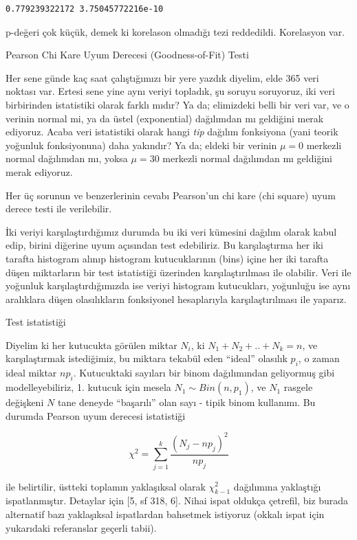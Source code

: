 \documentclass[12pt,fleqn]{article}\usepackage{../../common}
\begin{document}
\begin{verbatim}
0.779239322172 3.75045772216e-10
\end{verbatim}

p-değeri çok küçük, demek ki korelason olmadığı tezi reddedildi. Korelasyon
var.

Pearson Chi Kare Uyum Derecesi (Goodness-of-Fit) Testi

Her sene günde kaç saat çalıştığımızı bir yere yazdık diyelim, elde 365
veri noktası var. Ertesi sene yine aynı veriyi topladık, şu soruyu
soruyoruz, iki veri birbirinden istatistiki olarak farklı mıdır?  Ya da;
elimizdeki belli bir veri var, ve o verinin normal mi, ya da üstel
(exponential) dağılımdan mı geldiğini merak ediyoruz. Acaba veri
istatistiki olarak hangi {\em tip} dağılım fonksiyona (yani teorik yoğunluk
fonksiyonuna) daha yakındır? Ya da; eldeki bir verinin $\mu = 0$ merkezli
normal dağılımdan mı, yoksa $\mu = 30$ merkezli normal dağılımdan mı
geldiğini merak ediyoruz.

Her üç sorunun ve benzerlerinin cevabı Pearson'un chi kare (chi square)
uyum derece testi ile verilebilir. 

İki veriyi karşılaştırdığımız durumda bu iki veri kümesini dağılım olarak
kabul edip, birini diğerine uyum açısından test edebiliriz. Bu
karşılaştırma her iki tarafta histogram alınıp histogram kutucuklarının
(bins) içine her iki tarafta düşen miktarların bir test istatistiği
üzerinden karşılaştırılması ile olabilir. Veri ile yoğunluk
karşılaştırdığımızda ise veriyi histogram kutucukları, yoğunluğu ise aynı
aralıklara düşen olasılıkların fonksiyonel hesaplarıyla karşılaştırılması
ile yaparız. 

Test istatistiği 

Diyelim ki her kutucukta görülen miktar $N_i$, ki $N_1 + N_2 + .. + N_k =
n$, ve karşılaştırmak istediğimiz, bu miktara tekabül eden ``ideal''
olasılık $p_i$, o zaman ideal miktar $n p_i$. Kutucuktaki sayıları bir
binom dağılımından geliyormuş gibi modelleyebiliriz, 1. kutucuk için mesela
$N_1 \sim Bin(n,p_1)$, ve $N_1$ rasgele değişkeni $N$ tane deneyde
``başarılı'' olan sayı - tipik binom kullanımı. Bu durumda Pearson uyum
derecesi istatistiği

$$
\chi^2 = \sum_{j=1}^{k} \frac{(N_j - np_j)^2}{np_j}
$$

ile belirtilir, üstteki toplamın yaklaşıksal olarak $\chi^2_{k-1}$
dağılımına yaklaştığı ispatlanmıştır. Detaylar için [5, sf 318, 6]. Nihai
ispat oldukça çetrefil, biz burada alternatif bazı yaklaşıksal ispatlardan
bahsetmek istiyoruz (okkalı ispat için yukarıdaki referanslar geçerli
tabii).
\end{document}
